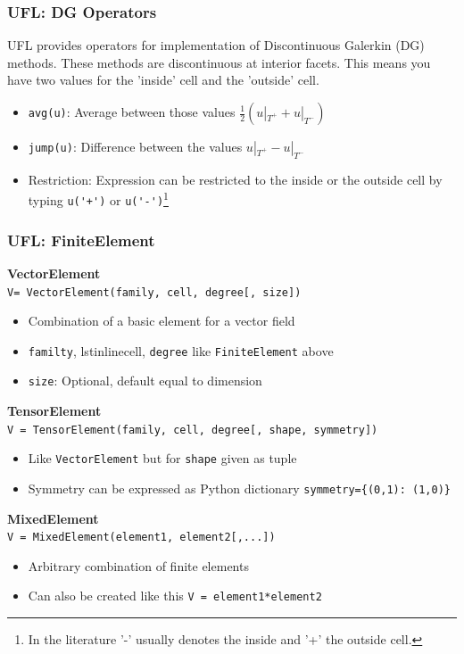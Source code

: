\documentclass[aspectratio=169,11pt]{beamer}
\theoremstyle{definition}
\begin{document}
\begin{frame}[fragile]
  \frametitle{UFL: DG Operators} UFL provides operators for implementation of
  Discontinuous Galerkin (DG) methods. These methods are discontinuous at
  interior facets. This means you have two values for the 'inside' cell and the
  'outside' cell.
  \begin{itemize}
  \item \lstinline{avg(u)}: Average between those values
    $\frac{1}{2}(u|_{T^+}+u|_{T^-})$
  \item \lstinline{jump(u)}: Difference between the values $u|_{T^+}-u|_{T^-}$
  \item Restriction: Expression can be restricted to the inside or the outside
    cell by typing \lstinline{u('+')} or \lstinline{u('-')}\footnote{In the
      literature '-' usually denotes the inside and '+' the outside cell.}
  \end{itemize}
\end{frame}

\begin{frame}[fragile]
  \frametitle{UFL: FiniteElement}
  \textbf{VectorElement}\\
  \lstinline[basicstyle=\small]{V= VectorElement(family, cell, degree[, size])}
  \begin{itemize}
  \item Combination of a basic element for a vector field
  \item \lstinline{familty}, lstinline{cell}, \lstinline{degree} like \lstinline{FiniteElement} above
  \item \lstinline{size}: Optional, default equal to dimension
  \end{itemize}

  \textbf{TensorElement}\\
  \lstinline[basicstyle=\small]{V = TensorElement(family, cell, degree[, shape, symmetry])}
  \begin{itemize}
  \item Like \lstinline{VectorElement} but for \lstinline{shape} given as tuple
  \item Symmetry can be expressed as Python dictionary
    \lstinline|symmetry={(0,1): (1,0)}|
  \end{itemize}


  \textbf{MixedElement}\\
  \lstinline[basicstyle=\small]{V = MixedElement(element1, element2[,...])}
  \begin{itemize}
  \item Arbitrary combination of finite elements
  \item Can also be created like this \lstinline{V = element1*element2}
  \end{itemize}
\end{frame}
\end{document}
